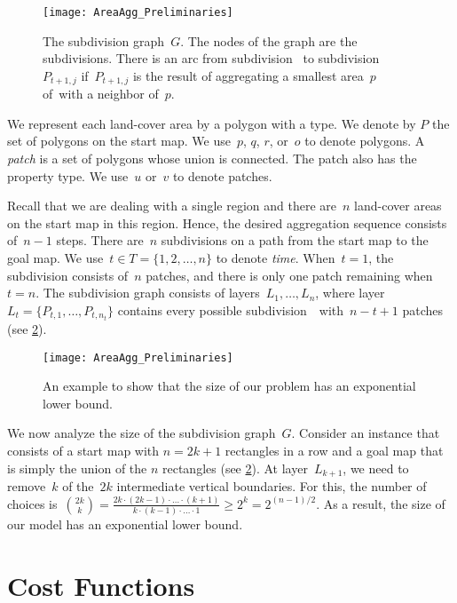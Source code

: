 \begin{figure}[tb]
\centering
\texttt{[image: AreaAgg\_Preliminaries]}
\caption{The subdivision graph~$G$. 
	The nodes of the graph are the subdivisions. 
	There is an arc	from subdivision~\Pnode 
	to subdivision~${P}_{t+1,j}$ 
	if~${P}_{t+1,j}$ is the result of 
	aggregating a smallest area~$p$ of~\Pnode with a 
	neighbor of~$p$.}
\label{fig:AreaAgg_SubdivisionName}
\end{figure}

We represent each land-cover area by a polygon with a type.
We denote by $P$ the set of polygons on the start map.
We use~$p$, $q$, $r$, or~$o$ to denote polygons.
A \emph{patch} is a set of polygons whose union is connected. 
The patch also has the property type.
We use~$u$ or~$v$ to denote patches.


Recall that we are dealing with a single region and 
there are~$n$ land-cover areas on the start map in this region. 
Hence, the desired aggregation sequence consists of~$n-1$ steps. 
There are~$n$ subdivisions on a path 
from the start map to the goal map. 
We use~$t \in {T}=\{1,2,\dots,n\}$ to denote \emph{time}. 
When~$t=1$, the subdivision consists of~$n$ patches, 
and there is only one patch remaining when~$t=n$.
The subdivision graph consists of layers~${L}_1,\dots,{L}_n$, 
where layer~${L}_t=\{{P}_{t,1},\dots,{P}_{t,n_t}\}$
contains every possible subdivision~\Pnode\ with~$n-t+1$ patches (see \fig\ref{fig:AreaAgg_ExponentialSize}).

\begin{figure}[tb]
\centering
\texttt{[image: AreaAgg\_Preliminaries]}
\caption{An example to show that the size of our problem 
	has an exponential lower bound.}
\label{fig:AreaAgg_ExponentialSize}
\end{figure}

We now analyze the size of the subdivision graph~$G$.
Consider an instance that consists of 
a start map with $n=2k+1$ rectangles in a row and
a goal map that is simply the union of the $n$ rectangles
(see \fig\ref{fig:AreaAgg_ExponentialSize}).
At layer~$L_{k+1}$, we need to remove~$k$ of the~$2k$ 
intermediate vertical boundaries. 
For this, the number of choices is~$
{{2k}\choose{k}}
= \frac{2k\cdot (2k-1)\cdot \ldots \cdot (k+1)}
{k\cdot (k-1)\cdot \ldots \cdot 1}
\ge 2^k = 2^{(n-1)/2}$.
As a result, the size of our model
has an exponential lower bound.


\section{Cost Functions}
\label{sec:AreaAgg_CostFunctions}

